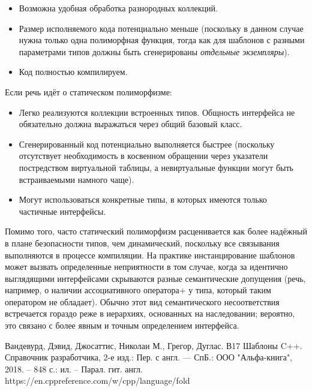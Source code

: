 \documentclass[a4paper,12pt]{article}	%
\begin{document}
	\begin{itemize}
	
		\item Возможна удобная обработка разнородных коллекций.
		
		\item Размер исполняемого кода потенциально меньше (поскольку в данном случае нужна только одна полиморфная функция, тогда как для шаблонов с разными параметрами типов должны быть сгенерированы \textit{отдельные экземпляры}).
		
		\item Код полностью компилируем.
	
	\end{itemize}
	
	Если речь идёт о статическом полиморфизме:
	
	\begin{itemize}
	
		\item Легко реализуются коллекции встроенных типов. Общность интерфейса не обязательно должна выражаться через общий базовый класс.
		
		\item Сгенерированный код потенциально выполняется быстрее (поскольку отсутствует необходимость в косвенном обращении через указатели постредством виртуальной таблицы, а невиртуальные функции могут быть встраиваемыми намного чаще).
		
		\item Могут использоваться конкретные типы, в которых имеются только частичные интерфейсы.
	
	\end{itemize}	
	
	Помимо того, часто статический полиморфизм расценивается как более надёжный в плане безопасности типов, чем динамический, поскольку все связывания выполняются в процессе компиляции. На практике инстанцирование шаблонов может вызвать определенные неприятности в том случае, когда за идентично выглядящими интерфейсами скрываются разные семантические допущения (речь, например, о наличии ассоциативного оператора+ у типа, который таким оператором не обладает). Обычно этот вид семантического несоответствия встречается гораздо реже в иерархиях, основанных на наследовании; вероятно, это связано с более явным и точным определением интерфейса.

\newpage


 
	\begin{thebibliography}{}
	
		 Вандевурд, Дэвид, Джосаттис, Николаи М., Грегор, Дуглас. В17 Шаблоны C++. Справочник разработчика, 2-е изд.: Пер. с англ. — СпБ.: ООО "Альфа-книга", 2018. -- 848 с.: ил. -- Парал. гит. англ.
		 https://en.cppreference.com/w/cpp/language/fold
		
	\end{thebibliography}
\end{document}
